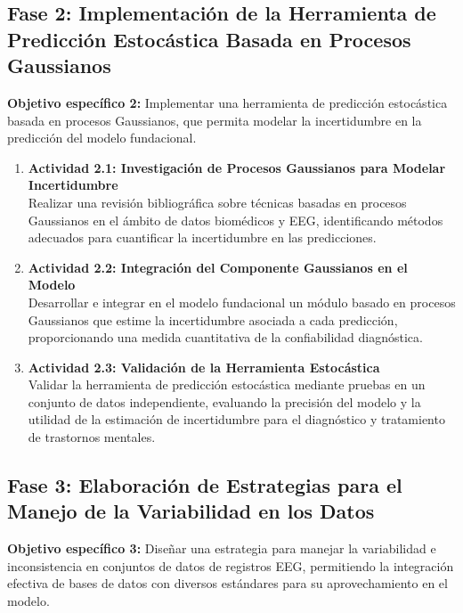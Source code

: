 \subsection*{Fase 2: Implementación de la Herramienta de Predicción Estocástica Basada en Procesos Gaussianos}
\textbf{Objetivo específico 2:} Implementar una herramienta de predicción estocástica basada en procesos Gaussianos, que permita modelar la incertidumbre en la predicción del modelo fundacional.

\begin{enumerate}
	\item \textbf{Actividad 2.1: Investigación de Procesos Gaussianos para Modelar Incertidumbre}\\
	Realizar una revisión bibliográfica sobre técnicas basadas en procesos Gaussianos en el ámbito de datos biomédicos y EEG, identificando métodos adecuados para cuantificar la incertidumbre en las predicciones.
	
	\item \textbf{Actividad 2.2: Integración del Componente Gaussianos en el Modelo}\\
	Desarrollar e integrar en el modelo fundacional un módulo basado en procesos Gaussianos que estime la incertidumbre asociada a cada predicción, proporcionando una medida cuantitativa de la confiabilidad diagnóstica.
	
	\item \textbf{Actividad 2.3: Validación de la Herramienta Estocástica}\\
	Validar la herramienta de predicción estocástica mediante pruebas en un conjunto de datos independiente, evaluando la precisión del modelo y la utilidad de la estimación de incertidumbre para el diagnóstico y tratamiento de trastornos mentales.
\end{enumerate}

\subsection*{Fase 3: Elaboración de Estrategias para el Manejo de la Variabilidad en los Datos}
\textbf{Objetivo específico 3:} Diseñar una estrategia para manejar la variabilidad e inconsistencia en conjuntos de datos de registros EEG, permitiendo la integración efectiva de bases de datos con diversos estándares para su aprovechamiento en el modelo.

